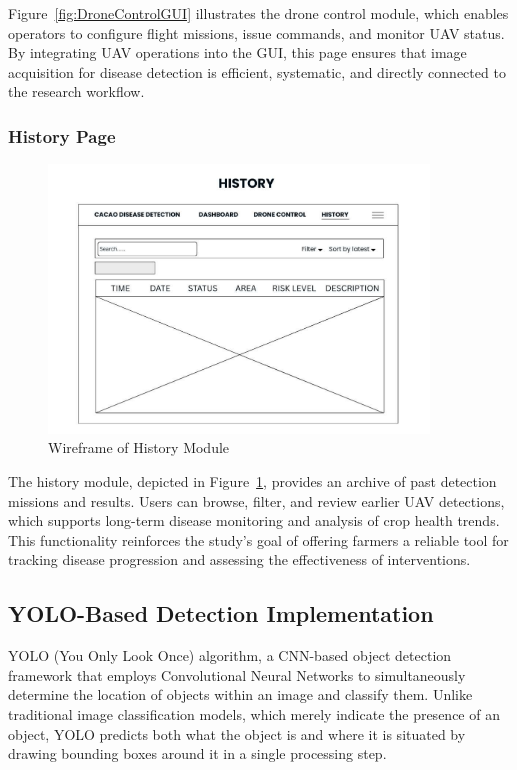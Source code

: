 Figure~\ref{fig:DroneControlGUI} illustrates the drone control module, which enables operators to configure flight missions, issue commands, and monitor UAV status. By integrating UAV operations into the GUI, this page ensures that image acquisition for disease detection is efficient, systematic, and directly connected to the research workflow.

\subsubsection*{History Page}

\begin{figure}[H]
	\centering
	\caption{Wireframe of History Module}
	\label{fig:HistoryGUI}
	\includegraphics[width=0.9\textwidth]{figures/History.pdf}
\end{figure}

The history module, depicted in Figure~\ref{fig:HistoryGUI}, provides an archive of past detection missions and results. Users can browse, filter, and review earlier UAV detections, which supports long-term disease monitoring and analysis of crop health trends. This functionality reinforces the study’s goal of offering farmers a reliable tool for tracking disease progression and assessing the effectiveness of interventions.

\subsection{YOLO-Based Detection Implementation}
YOLO (You Only Look Once) algorithm, a CNN-based object detection framework that employs Convolutional Neural Networks to simultaneously determine the location of objects within an image and classify them. Unlike traditional image classification models, which merely indicate the presence of an object, YOLO predicts both what the object is and where it is situated by drawing bounding boxes around it in a single processing step.

